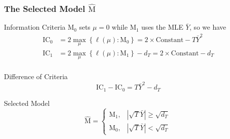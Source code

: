 \begin{frame}
  \frametitle{The Selected Model $\widehat{\text{M}}$}

  \begin{block}{Information Criteria}
  M$_0$ sets $\mu=0$ while M$_1$ uses the MLE $\bar{Y}$, so we have
  \vspace{1em}
  \begin{align*}
    \text{IC}_0 &= 2 \max_\mu \left\{ \ell(\mu) \colon \text{M}_0 \right\} = 2 \times \text{Constant} - T\bar{Y}^2\\ 
    \text{IC}_1 &= 2 \max_\mu \left\{ \ell(\mu) \colon \text{M}_1 \right\} - d_T = 2 \times \text{Constant} - d_T\\ 
  \end{align*}
\end{block}

\pause

\vspace{-2em}

  \begin{block}{Difference of Criteria}
    \vspace{-1em}
  \[
    \text{IC}_1 - \text{IC}_0 = T \bar{Y}^2 - d_T
  \]
\end{block}

\pause

\vspace{-1em}

  \begin{block}{Selected Model}
    \vspace{-1em}
   \[
     \widehat{\text{M}} = \left\{
       \begin{array}{cc}
         \text{M}_1, & |\sqrt{T} \bar{Y}| \geq \sqrt{d_T}\\
         \text{M}_0, & |\sqrt{T} \bar{Y}| < \sqrt{d_T}
       \end{array}
       \right.
   \]
  \end{block}
\end{frame}
